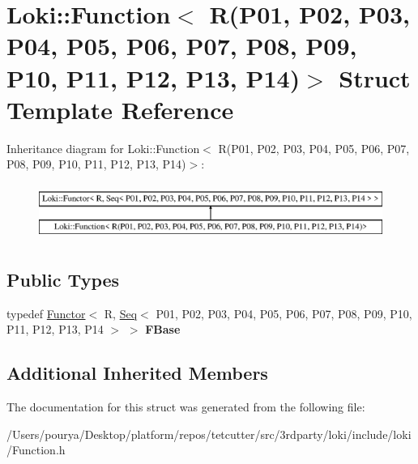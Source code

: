 \hypertarget{structLoki_1_1Function_3_01R_07P01_00_01P02_00_01P03_00_01P04_00_01P05_00_01P06_00_01P07_00_01P0376b58c87c711311c6a7d2cd527487a6}{}\section{Loki\+:\+:Function$<$ R(P01, P02, P03, P04, P05, P06, P07, P08, P09, P10, P11, P12, P13, P14)$>$ Struct Template Reference}
\label{structLoki_1_1Function_3_01R_07P01_00_01P02_00_01P03_00_01P04_00_01P05_00_01P06_00_01P07_00_01P0376b58c87c711311c6a7d2cd527487a6}
Inheritance diagram for Loki\+:\+:Function$<$ R(P01, P02, P03, P04, P05, P06, P07, P08, P09, P10, P11, P12, P13, P14)$>$\+:\begin{figure}[H]
\begin{center}
\leavevmode
\includegraphics[height=1.854305cm]{structLoki_1_1Function_3_01R_07P01_00_01P02_00_01P03_00_01P04_00_01P05_00_01P06_00_01P07_00_01P0376b58c87c711311c6a7d2cd527487a6}
\end{center}
\end{figure}
\subsection*{Public Types}
\begin{DoxyCompactItemize}
\item 
\hypertarget{structLoki_1_1Function_3_01R_07P01_00_01P02_00_01P03_00_01P04_00_01P05_00_01P06_00_01P07_00_01P0376b58c87c711311c6a7d2cd527487a6_aa2c1f54a4a4f536ae84f2d5f02e4f5f8}{}typedef \hyperlink{classLoki_1_1Functor}{Functor}$<$ R, \hyperlink{structLoki_1_1Seq}{Seq}$<$ P01, P02, P03, P04, P05, P06, P07, P08, P09, P10, P11, P12, P13, P14 $>$ $>$ {\bfseries F\+Base}\label{structLoki_1_1Function_3_01R_07P01_00_01P02_00_01P03_00_01P04_00_01P05_00_01P06_00_01P07_00_01P0376b58c87c711311c6a7d2cd527487a6_aa2c1f54a4a4f536ae84f2d5f02e4f5f8}

\end{DoxyCompactItemize}
\subsection*{Additional Inherited Members}


The documentation for this struct was generated from the following file\+:\begin{DoxyCompactItemize}
\item 
/\+Users/pourya/\+Desktop/platform/repos/tetcutter/src/3rdparty/loki/include/loki/Function.\+h\end{DoxyCompactItemize}
